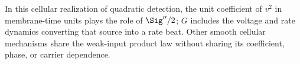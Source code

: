 In this cellular realization of quadratic detection, the unit coefficient of $v^2$ in membrane-time units
plays the role of $\Sig''/2$; $G$ includes the voltage and rate dynamics
converting that source into a rate beat. Other smooth cellular mechanisms
share the weak-input product law without sharing its coefficient, phase,
or carrier dependence.

